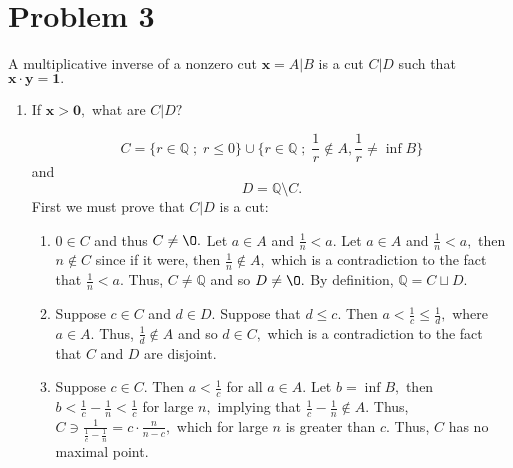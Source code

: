 \documentclass[11pt]{article}
\newcommand{\bbQ}{\mathbb{Q}}
\renewcommand{\emptyset}{\O}
\newcommand{\sm}{\setminus}
\begin{document}
\section*{Problem 3}
\begin{problem}
    A multiplicative inverse of a nonzero cut $\textbf{x} = A | B$ is a cut $C | D$ such that $\textbf{x} \cdot \textbf{y} = \textbf{1}.$
\end{problem}
\begin{enumerate}
    \item
    \begin{problem}
        If $\textbf{x}> \textbf{0},$ what are $C | D?$
    \end{problem}
    \begin{solution}
        \[C = \{r \in \bbQ \; ; \; r\leq 0 \} \cup \{r \in \bbQ \; ; \; \frac{1}{r}\notin A, \frac{1}{r}\neq \inf{B}\}\] and \[D = \bbQ \sm C.\]  First we must prove that $C | D$ is a cut:
        \begin{enumerate}
            \item $0\in C$ and thus $C\neq \emptyset.$ Let $a\in A$ and $\frac{1}{n}<a.$ Let $a\in A$ and $\frac{1}{n}<a,$ then $n\notin C$ since if it were, then $\frac{1}{n}\notin A,$ which is a contradiction to the fact that $\frac{1}{n}<a.$ Thus, $C\neq \bbQ$ and so $D \neq \emptyset.$ By definition, $\bbQ = C \sqcup D.$ 
            \item Suppose $c\in C$ and $d\in D.$ Suppose that $d\leq c.$ Then $a<\frac{1}{c}\leq \frac{1}{d},$ where $a\in A.$ Thus, $\frac{1}{d}\notin A$ and so $d\in C,$ which is a contradiction to the fact that $C$ and $D$ are disjoint.
            \item Suppose $c\in C.$ Then $a< \frac{1}{c}$ for all $a\in A.$ Let $b = \inf B,$ then $b<\frac{1}{c} - \frac{1}{n}<\frac{1}{c}$ for large $n,$ implying that $\frac{1}{c} - \frac{1}{n} \notin A.$ Thus, $C\ni \frac{1}{\frac{1}{c} - \frac{1}{n}} = c \cdot \frac{n}{n-c},$ which for large $n$ is greater than $c.$ Thus, $C$ has no maximal point. 
        \end{enumerate}
        

\end{solution}
\end{enumerate}
\end{document}
